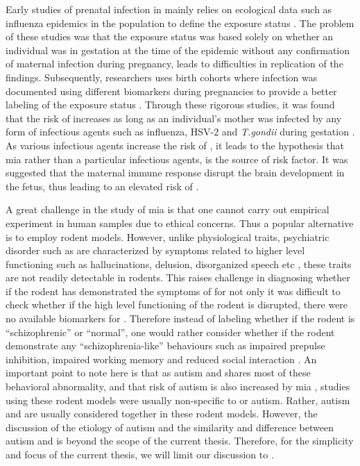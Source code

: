\documentclass[12pt]{scrbook}
\newcommand*{\glng}{\glsentrylong}
\begin{document}
	Early studies of prenatal infection in \glng{scz} mainly relies on ecological data such as influenza epidemics in the population to define the exposure status \citep{Brown2010}.
	The problem of these studies was that the exposure status was based solely on whether an individual was in gestation at the time of the epidemic without any confirmation of maternal infection during pregnancy, leads to difficulties in replication of the findings.
	Subsequently, researchers uses birth cohorts where infection was documented using different biomarkers during pregnancies to provide a better labeling of the exposure status \citep{Brown2010}.
	Through these rigorous studies, it was found that the risk of \glng{scz} increases as long as an individual's mother was infected by any form of infectious agents such as influenza, HSV-2 and \textit{T.gondii} during gestation \citep{Brown2010}.
	As various infectious agents increase the risk of \glng{scz}, it leads to the hypothesis that \gls{mia} \citep{Brown2010} rather than a particular infectious agents, is the source of risk factor. 
	It was suggested that the maternal immune response disrupt the brain development in the fetus, thus leading to an elevated risk of \glng{scz} \citep{Garbett2012a}.
	
	A great challenge in the study of \gls{mia} is that one cannot carry out empirical experiment in human samples due to ethical concerns.
	Thus a popular alternative is to employ rodent models.
	However, unlike physiological traits, psychiatric disorder such as \glng{scz} are characterized by symptoms related to higher level functioning such as hallucinations, delusion, disorganized speech etc \citep{AmericanPsychiatricAssociation2013}, these traits are not readily detectable in rodents.
	This raises challenge in diagnosing whether if the rodent has demonstrated the symptoms of \glng{scz} for not only it was difficult to check whether if the high level functioning of the rodent is disrupted, there were no available biomarkers for \glng{scz}.
	Therefore instead of labeling whether if the rodent is ``schizophrenic'' or ``normal'', one would rather consider whether if the rodent demonstrate any ``schizophrenia-like'' behaviours such as impaired prepulse inhibition, impaired working memory and reduced social interaction \citep{Meyer2007a}.
	An important point to note here is that as autism and \glng{scz} shares most of these behavioral abnormality, and that risk of autism is also increased by \gls{mia} \citep{Brown2012}, studies using these rodent models were usually non-specific to \glng{scz} or autism. 
	Rather, autism and \glng{scz} are usually considered together in these rodent models.
	However, the discussion of the etiology of autism and the similarity and difference between autism and \glng{szc} is beyond the scope of the current thesis.
	Therefore, for the simplicity and focus of the current thesis, we will limit our discussion to \glng{scz}.
	
\end{document}
